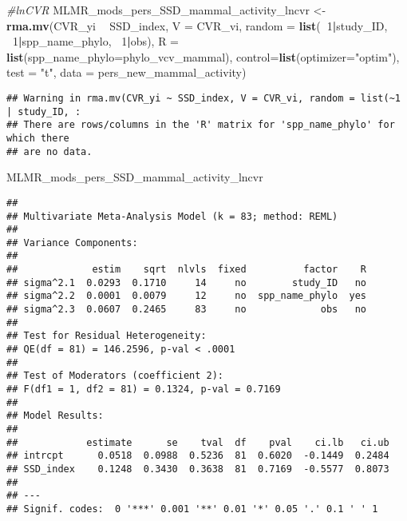 \documentclass[]{article}
\newenvironment{Shaded}{\begin{snugshade}}{\end{snugshade}}
\newcommand{\KeywordTok}[1]{\textcolor[rgb]{0.13,0.29,0.53}{\textbf{#1}}}
\newcommand{\DataTypeTok}[1]{\textcolor[rgb]{0.13,0.29,0.53}{#1}}
\newcommand{\DecValTok}[1]{\textcolor[rgb]{0.00,0.00,0.81}{#1}}
\newcommand{\StringTok}[1]{\textcolor[rgb]{0.31,0.60,0.02}{#1}}
\newcommand{\CommentTok}[1]{\textcolor[rgb]{0.56,0.35,0.01}{\textit{#1}}}
\newcommand{\OperatorTok}[1]{\textcolor[rgb]{0.81,0.36,0.00}{\textbf{#1}}}
\newcommand{\NormalTok}[1]{#1}
\begin{document}
\begin{Shaded}
\begin{Highlighting}[]
    \CommentTok{#lnCVR}
\NormalTok{    MLMR_mods_pers_SSD_mammal_activity_lncvr <-}\StringTok{ }\KeywordTok{rma.mv}\NormalTok{(CVR_yi }\OperatorTok{~}\StringTok{ }\NormalTok{SSD_index, }\DataTypeTok{V =}\NormalTok{ CVR_vi, }
                                            \DataTypeTok{random =} \KeywordTok{list}\NormalTok{(}\OperatorTok{~}\DecValTok{1}\OperatorTok{|}\NormalTok{study_ID, }\OperatorTok{~}\DecValTok{1}\OperatorTok{|}\NormalTok{spp_name_phylo, }\OperatorTok{~}\DecValTok{1}\OperatorTok{|}\NormalTok{obs), }
                                            \DataTypeTok{R =} \KeywordTok{list}\NormalTok{(}\DataTypeTok{spp_name_phylo=}\NormalTok{phylo_vcv_mammal), }\DataTypeTok{control=}\KeywordTok{list}\NormalTok{(}\DataTypeTok{optimizer=}\StringTok{"optim"}\NormalTok{), }
                                            \DataTypeTok{test =} \StringTok{"t"}\NormalTok{, }\DataTypeTok{data =}\NormalTok{ pers_new_mammal_activity)}
\end{Highlighting}
\end{Shaded}

\begin{verbatim}
## Warning in rma.mv(CVR_yi ~ SSD_index, V = CVR_vi, random = list(~1 | study_ID, :
## There are rows/columns in the 'R' matrix for 'spp_name_phylo' for which there
## are no data.
\end{verbatim}

\begin{Shaded}
\begin{Highlighting}[]
\NormalTok{    MLMR_mods_pers_SSD_mammal_activity_lncvr}
\end{Highlighting}
\end{Shaded}

\begin{verbatim}
## 
## Multivariate Meta-Analysis Model (k = 83; method: REML)
## 
## Variance Components:
## 
##             estim    sqrt  nlvls  fixed          factor    R 
## sigma^2.1  0.0293  0.1710     14     no        study_ID   no 
## sigma^2.2  0.0001  0.0079     12     no  spp_name_phylo  yes 
## sigma^2.3  0.0607  0.2465     83     no             obs   no 
## 
## Test for Residual Heterogeneity:
## QE(df = 81) = 146.2596, p-val < .0001
## 
## Test of Moderators (coefficient 2):
## F(df1 = 1, df2 = 81) = 0.1324, p-val = 0.7169
## 
## Model Results:
## 
##            estimate      se    tval  df    pval    ci.lb   ci.ub 
## intrcpt      0.0518  0.0988  0.5236  81  0.6020  -0.1449  0.2484    
## SSD_index    0.1248  0.3430  0.3638  81  0.7169  -0.5577  0.8073    
## 
## ---
## Signif. codes:  0 '***' 0.001 '**' 0.01 '*' 0.05 '.' 0.1 ' ' 1
\end{verbatim}
\end{document}
